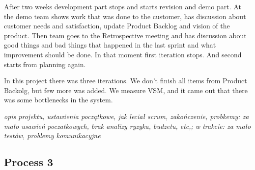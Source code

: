 After two weeks development part stops and starts revision and demo part. At the demo team shows work that was done to the customer, has discussion about customer needs and satisfaction, update Product Backlog and vision of the product. Then team goes to the Retrospective meeting and has discussion about good things and bad things that happened in the last sprint and what improvement should be done. In that moment first iteration stops. And second starts from planning again.

In this project there was three iterations. We don't finish all items from Product Backolg, but few more was added. We measure VSM, and it came out that there was some bottlenecks in the system. 

\textit{opis projektu, ustawienia początkowe, jak leciał scrum, zakończenie, probkemy: za mało usawień poczatkowych, brak analizy ryzyka, budzetu, etc,; w trakcie: za mało testów, problemy komunikacyjne}

\subsection*{Process 3}
